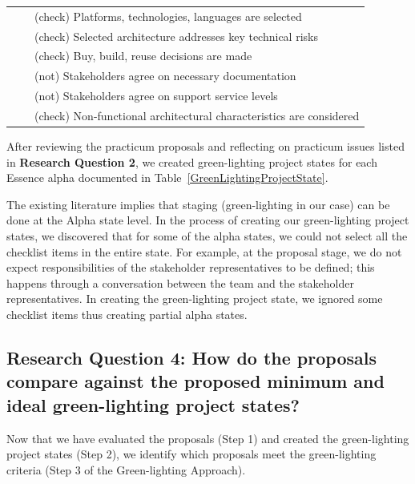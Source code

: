 \documentclass[conference]{IEEEtran}
\begin{document}
\begin{table}
\begin{tabular}{|l|p{2.50in}|p{3.35in}|}
                &                                     & (check) Platforms, technologies, languages are selected \\
                &                                     & (check) Selected architecture addresses key technical risks \\
                &                                     & (check) Buy, build, reuse decisions are made \\
                &                                     & (not) Stakeholders agree on necessary documentation \\
                &                                     & (not) Stakeholders agree on support service levels \\
                &                                     & (check) Non-functional architectural characteristics are considered \\ \hline
\end{tabular}
\end{table}

After reviewing the practicum proposals and reflecting on practicum
issues listed in \textbf{Research Question 2}, we created green-lighting project
states for each Essence alpha documented in Table~\ref{GreenLightingProjectState}.

The existing literature \cite{EssenceBook} implies
that staging (green-lighting in our case) can be done at the Alpha state
level. In the process of creating our green-lighting project states, we
discovered that for some of the alpha states, we could not select all
the checklist items in the entire state. For example, at the proposal
stage, we do not expect responsibilities of the stakeholder
representatives to be defined; this happens through a conversation
between the team and the stakeholder representatives. In creating the
green-lighting project state, we ignored some checklist items thus
creating partial alpha states.

\subsection{Research Question 4: How do the proposals
compare against the proposed minimum and ideal green-lighting project
states?}

Now that we have evaluated the proposals (Step 1) and created the
green-lighting project states (Step 2), we identify which proposals
meet the green-lighting criteria (Step 3 of the Green-lighting Approach). 
\end{document}
